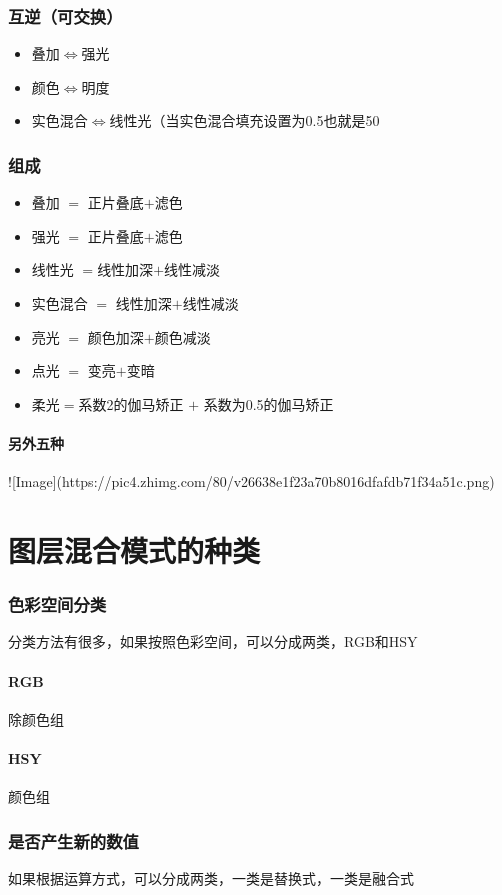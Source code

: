 \subsection{ 互逆（可交换）}
\begin{itemize}
	\item 叠加$\Leftrightarrow$强光
	\item 颜色$\Leftrightarrow$明度
	\item 实色混合$\Leftrightarrow$线性光（当实色混合填充设置为0.5也就是50%
\end{itemize}
\subsection{ 组成}

\begin{itemize}
	\item 叠加 $=$ 正片叠底$+$滤色
	\item 强光 $=$ 正片叠底$+$滤色
	\item 线性光 $=$线性加深$+$线性减淡
	\item 实色混合 $=$ 线性加深$+$线性减淡
	\item 亮光 $=$ 颜色加深$+$颜色减淡
	\item 点光 $=$ 变亮$+$变暗
	\item 柔光$=$系数2的伽马矫正 $+$ 系数为0.5的伽马矫正
\end{itemize}
\subsubsection{ 另外五种}
![Image](https://pic4.zhimg.com/80/v26638e1f23a70b8016dfafdb71f34a51c.png)
\chapter{图层混合模式的种类}
\subsection{ 色彩空间分类}
分类方法有很多，如果按照色彩空间，可以分成两类，RGB和HSY
\subsubsection{ RGB}
除颜色组
\subsubsection{ HSY}
颜色组
\subsection{ 是否产生新的数值}
如果根据运算方式，可以分成两类，一类是替换式，一类是融合式
